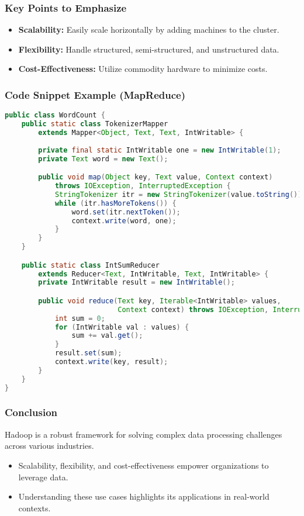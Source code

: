 \documentclass[aspectratio=169]{beamer}
\begin{document}
\begin{frame}
    \frametitle{Key Points to Emphasize}
    \begin{itemize}
        \item \textbf{Scalability:} Easily scale horizontally by adding machines to the cluster.
        \item \textbf{Flexibility:} Handle structured, semi-structured, and unstructured data.
        \item \textbf{Cost-Effectiveness:} Utilize commodity hardware to minimize costs.
    \end{itemize}
\end{frame}

\begin{frame}[fragile]
    \frametitle{Code Snippet Example (MapReduce)}
    \begin{lstlisting}[language=java]
public class WordCount {
    public static class TokenizerMapper
        extends Mapper<Object, Text, Text, IntWritable> {
      
        private final static IntWritable one = new IntWritable(1);
        private Text word = new Text();

        public void map(Object key, Text value, Context context) 
            throws IOException, InterruptedException {
            StringTokenizer itr = new StringTokenizer(value.toString());
            while (itr.hasMoreTokens()) {
                word.set(itr.nextToken());
                context.write(word, one);
            }
        }
    }

    public static class IntSumReducer
        extends Reducer<Text, IntWritable, Text, IntWritable> {
        private IntWritable result = new IntWritable();

        public void reduce(Text key, Iterable<IntWritable> values, 
                           Context context) throws IOException, InterruptedException {
            int sum = 0;
            for (IntWritable val : values) {
                sum += val.get();
            }
            result.set(sum);
            context.write(key, result);
        }
    }
}
    \end{lstlisting}
\end{frame}

\begin{frame}
    \frametitle{Conclusion}
    Hadoop is a robust framework for solving complex data processing challenges across various industries. 
    \begin{itemize}
        \item Scalability, flexibility, and cost-effectiveness empower organizations to leverage data.
        \item Understanding these use cases highlights its applications in real-world contexts.
    \end{itemize}
\end{frame}
\end{document}
